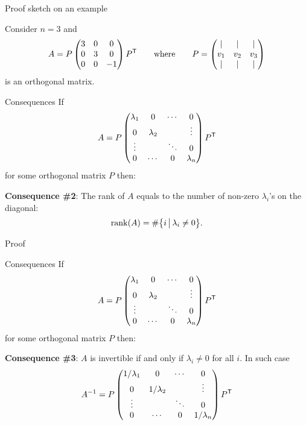\documentclass{beamer}
\begin{document}
\begin{frame}[t]{Proof sketch on an example}
	\grid

	\vspace{-0.3cm}
	Consider $n=3$ and 
	$$
	A = P
	\begin{pmatrix}
		3 & 0 &  0 \\
		0 & 3 & 0 \\
		0 & 0 & -1 
	\end{pmatrix}
	P^{{\sf T}}
	\qquad
	\text{where}
	\qquad
	P=
	\begin{pmatrix}
		| & | &  | \\
		v_1 & v_2 & v_3 \\
		| & | & |
	\end{pmatrix}
	$$
	is an orthogonal matrix.
\\

\end{frame}
\begin{frame}[t]{Consequences}
	If 
	$$
	A = P
	\begin{pmatrix}
		\lambda_1 & 0 & \cdots & 0 \\
		0 & \lambda_2 & & \vdots \\
		\vdots &  & \ddots & 0 \\
		0 & \cdots & 0 & \lambda_n \\
	\end{pmatrix}
	P^{{\sf T}}
	$$
	for some orthogonal matrix $P$ then:

	\vspace{1cm}

\textbf{Consequence \#2}: The rank of $A$ equals to the number of non-zero $\lambda_i$'s on the diagonal:
$$
{{\rm rank}}(A) = \# \big\{ i \, \big| \, \lambda_i \neq 0 \big\}.
$$
\end{frame}
\begin{frame}[t]{Proof}
	\grid

\end{frame}
\begin{frame}[t]{Consequences}
	If 
	$$
	A = P
	\begin{pmatrix}
		\lambda_1 & 0 & \cdots & 0 \\
		0 & \lambda_2 & & \vdots \\
		\vdots &  & \ddots & 0 \\
		0 & \cdots & 0 & \lambda_n \\
	\end{pmatrix}
	P^{{\sf T}}
	$$
	for some orthogonal matrix $P$ then:

	\vspace{1cm}

	\textbf{Consequence \#3}: $A$ is invertible if and only if $\lambda_i \neq 0$ for all $i$. In such case
	$$
	A^{-1} = P
	\begin{pmatrix}
		1/\lambda_1 & 0 & \cdots & 0 \\
		0 & 1/\lambda_2 & & \vdots \\
		\vdots &  & \ddots & 0 \\
		0 & \cdots & 0 & 1/\lambda_n \\
	\end{pmatrix}
	P^{{\sf T}}
	$$
\end{frame}
\end{document}

